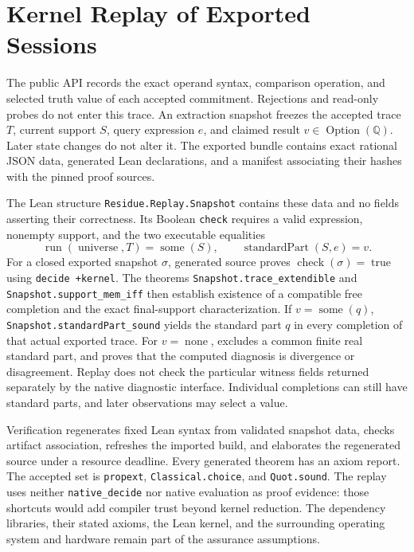 \documentclass[11pt,a4paper]{article}
\theoremstyle{result}
\theoremstyle{definition}
\newcommand{\Q}{\mathbb{Q}}
\newcommand{\code}[1]{\texttt{#1}}
\begin{document}
\section{Kernel Replay of Exported Sessions}\label{sec:replay}

The public API records the exact operand syntax, comparison operation, and selected truth value of each accepted commitment. Rejections and read-only probes do not enter this trace. An extraction snapshot freezes the accepted trace $T$, current support $S$, query expression $e$, and claimed result $v\in\operatorname{Option}(\Q)$. Later state changes do not alter it. The exported bundle contains exact rational JSON data, generated Lean declarations, and a manifest associating their hashes with the pinned proof sources.

The Lean structure \code{Residue.Replay.Snapshot} contains these data and no fields asserting their correctness. Its Boolean \code{check} requires a valid expression, nonempty support, and the two executable equalities
\[
  \operatorname{run}(\operatorname{universe},T)=\operatorname{some}(S),
  \qquad
  \operatorname{standardPart}(S,e)=v.
\]
For a closed exported snapshot $\sigma$, generated source proves $\operatorname{check}(\sigma)=\operatorname{true}$ using \code{decide +kernel}. The theorems \code{Snapshot.trace\_extendible} and \code{Snapshot.support\_mem\_iff} then establish existence of a compatible free completion and the exact final-support characterization. If $v=\operatorname{some}(q)$, \code{Snapshot.standardPart\_sound} yields the standard part $q$ in every completion of that actual exported trace. For $v=\operatorname{none}$,  excludes a common finite real standard part, and  proves that the computed diagnosis is divergence or disagreement. Replay does not check the particular witness fields returned separately by the native diagnostic interface. Individual completions can still have standard parts, and later observations may select a value.

Verification regenerates fixed Lean syntax from validated snapshot data, checks artifact association, refreshes the imported build, and elaborates the regenerated source under a resource deadline. Every generated theorem has an axiom report. The accepted set is \code{propext}, \code{Classical.choice}, and \code{Quot.sound}. The replay uses neither \code{native\_decide} nor native evaluation as proof evidence: those shortcuts would add compiler trust beyond kernel reduction. The dependency libraries, their stated axioms, the Lean kernel, and the surrounding operating system and hardware remain part of the assurance assumptions.
\end{document}
